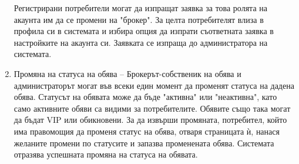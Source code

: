 \documentclass[a4paper]{article}
\begin{document}
\begin{enumerate}
{        Регистрирани потребители могат да изпращат заявка за това ролята на акаунта им да
        се промени на "брокер". За целта потребителят влиза в профила си в системата 
        и избира опция да изпрати съответната заявка в настройките на акаунта си. 
        Заявката се изпраща до администратора на системата.
}
\item {Промяна на статуса на обява -- 
        Брокерът-собственик на обява и администраторът могат във всеки един момент
        да променят статуса на дадена обява. Статусът на обявата може да бъде "активна"
        или "неактивна", като само активните обяви са видими за потребителите. Обявите
        също така могат да бъдат VIP или обикновени. За да извърши промяната, потребител,
        който има правомощия да променя статус на обява, отваря страницата ѝ, нанася
        желаните промени по статусите и запазва променената обява. Системата отразява
        успешната промяна на статуса на обявата.
}        
\end{enumerate}
\end{document}

